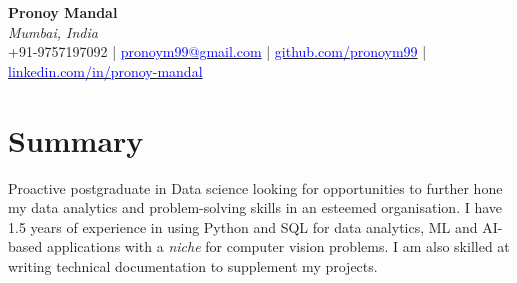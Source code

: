 \documentclass[a4paper,11pt]{article}
\makeatletter
\newcommand{\name}{Pronoy Mandal} %
\newcommand{\course}{Masters of Technology} %
\newcommand{\phone}{9757197092} %
\newcommand{\emaila}{pronoym99@gmail.com} %
\newcommand{\github}{https://github.com/pronoym99/} %
\newcommand{\linkedin}{https://www.linkedin.com/in/pronoy-mandal/} %
\makeatother
\begin{document}
\selectfont


\begin{center}
\textbf{\Huge \name} \\
\textit{Mumbai, India} \\
+91-9757197092 | \href{mailto:\emaila}{\textcolor{blue}{pronoym99@gmail.com}} | \href{https://github.com/\github}{\textcolor{blue}{github.com/pronoym99}} | \href{https://www.linkedin.com/in/\linkedin/}{\textcolor{blue}{linkedin.com/in/pronoy-mandal}}

\end{center}


  

\vspace{-2mm}
\section{\textbf{Summary}}

Proactive postgraduate in Data science looking for opportunities to further hone my data analytics and problem-solving skills in an esteemed organisation. I have 1.5 years of experience in using Python and SQL for data analytics, ML and AI-based applications with a \textit{niche} for computer vision problems. I am also skilled at writing technical documentation to supplement my projects.
\end{document}
